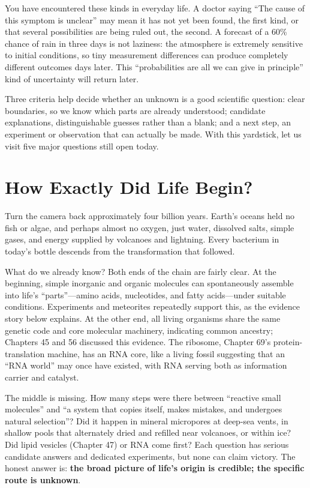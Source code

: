 You have encountered these kinds in everyday life. A doctor saying ``The cause of this symptom is unclear'' may mean it has not yet been found, the first kind, or that several possibilities are being ruled out, the second. A forecast of a 60\% chance of rain in three days is not laziness: the atmosphere is extremely sensitive to initial conditions, so tiny measurement differences can produce completely different outcomes days later. This ``probabilities are all we can give in principle'' kind of uncertainty will return later.

Three criteria help decide whether an unknown is a good scientific question: clear boundaries, so we know which parts are already understood; candidate explanations, distinguishable guesses rather than a blank; and a next step, an experiment or observation that can actually be made. With this yardstick, let us visit five major questions still open today.

\section{How Exactly Did Life Begin?}

Turn the camera back approximately four billion years. Earth's oceans held no fish or algae, and perhaps almost no oxygen, just water, dissolved salts, simple gases, and energy supplied by volcanoes and lightning. Every bacterium in today's bottle descends from the transformation that followed.

What do we already know? Both ends of the chain are fairly clear. At the beginning, simple inorganic and organic molecules can spontaneously assemble into life's ``parts''---amino acids, nucleotides, and fatty acids---under suitable conditions. Experiments and meteorites repeatedly support this, as the evidence story below explains. At the other end, all living organisms share the same genetic code and core molecular machinery, indicating common ancestry; Chapters 45 and 56 discussed this evidence. The ribosome, Chapter 69's protein-translation machine, has an RNA core, like a living fossil suggesting that an ``RNA world'' may once have existed, with RNA serving both as information carrier and catalyst.

The middle is missing. How many steps were there between ``reactive small molecules'' and ``a system that copies itself, makes mistakes, and undergoes natural selection''? Did it happen in mineral micropores at deep-sea vents, in shallow pools that alternately dried and refilled near volcanoes, or within ice? Did lipid vesicles (Chapter 47) or RNA come first? Each question has serious candidate answers and dedicated experiments, but none can claim victory. The honest answer is: \textbf{the broad picture of life's origin is credible; the specific route is unknown}.

